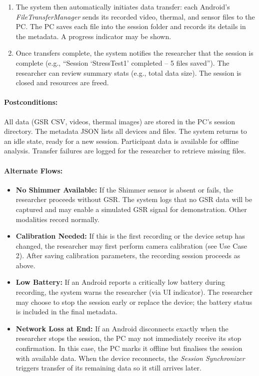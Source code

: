 \begin{enumerate}
    \item The system then automatically initiates data transfer: each Android’s \textit{FileTransferManager} sends its recorded video, thermal, and sensor files to the PC. The PC saves each file into the session folder and records its details in the metadata. A progress indicator may be shown.
    \item Once transfers complete, the system notifies the researcher that the session is complete (e.g., “Session ‘StressTest1’ completed – 5 files saved”). The researcher can review summary stats (e.g., total data size). The session is closed and resources are freed.
\end{enumerate}

\paragraph{Postconditions:} All data (GSR CSV, videos, thermal images) are stored in the PC's session directory. The metadata JSON lists all devices and files. The system returns to an idle state, ready for a new session. Participant data is available for offline analysis. Transfer failures are logged for the researcher to retrieve missing files.

\paragraph{Alternate Flows:}
\begin{itemize}
    \item \textbf{No Shimmer Available:} If the Shimmer sensor is absent or fails, the researcher proceeds without GSR. The system logs that no GSR data will be captured and may enable a simulated GSR signal for demonstration. Other modalities record normally.
    \item \textbf{Calibration Needed:} If this is the first recording or the device setup has changed, the researcher may first perform camera calibration (see Use Case 2). After saving calibration parameters, the recording session proceeds as above.
    \item \textbf{Low Battery:} If an Android reports a critically low battery during recording, the system warns the researcher (via UI indicator). The researcher may choose to stop the session early or replace the device; the battery status is included in the final metadata.
    \item \textbf{Network Loss at End:} If an Android disconnects exactly when the researcher stops the session, the PC may not immediately receive its stop confirmation. In this case, the PC marks it offline but finalises the session with available data. When the device reconnects, the \textit{Session Synchronizer} triggers transfer of its remaining data so it still arrives later.
\end{itemize}

